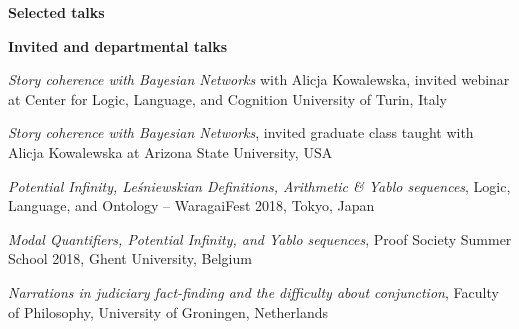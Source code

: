 \documentclass[10pt, a4paper]{article}
\newcommand{\years}[1]{\marginnote{\normalsize #1}}
\begin{document}


\vspace{0.5mm}



\vspace{0.5mm}







\vspace{0.5mm}

\years{2011}




\vspace{2mm}

\pagebreak


\large {\sc \textbf{Selected talks}}\normalsize

\setlength{\emergencystretch}{3em}



\vspace{1mm}


 {\sc \textbf{Invited and departmental talks}}\normalsize

\noindent

\vspace{1.5mm}

\years{2021}

\emph{Story coherence with Bayesian Networks} with Alicja Kowalewska, invited webinar at Center for Logic, Language, and Cognition University of Turin, Italy


\emph{Story coherence with Bayesian Networks}, invited graduate class taught with Alicja Kowalewska at Arizona State University, USA



\years{2018}

\emph{Potential Infinity, Le\' sniewskian Definitions, Arithmetic \& Yablo sequences}, Logic, Language, and Ontology -- WaragaiFest 2018, Tokyo, Japan

\vspace{0.5mm}


\emph{Modal Quantifiers, Potential Infinity, and Yablo sequences}, Proof Society Summer School 2018, Ghent University, Belgium

\vspace{0.5mm}

\years{2017} \emph{Narrations in judiciary fact-finding
and the difficulty about conjunction}, Faculty of Philosophy, University of Groningen, Netherlands
\end{document}
